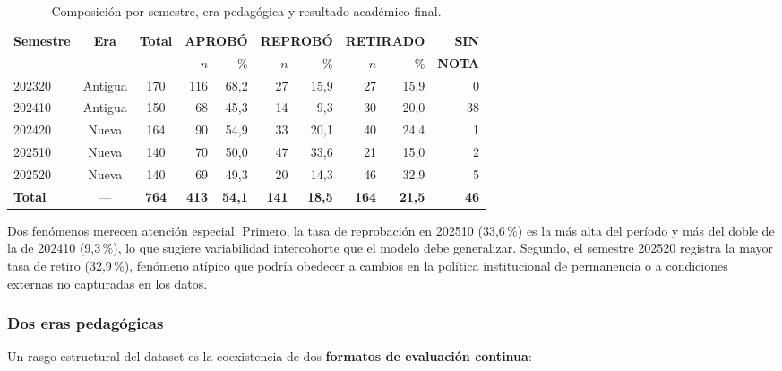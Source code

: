 \begin{table}[htbp]
  \centering
  \caption{Composición por semestre, era pedagógica y resultado
           académico final.}
  \label{tab:composicion_semestral}
  \small
  \begin{tabular}{lccrrrrrrr}
    \toprule
    \textbf{Semestre} & \textbf{Era} & \textbf{Total}
      & \multicolumn{2}{c}{\textbf{APROBÓ}}
      & \multicolumn{2}{c}{\textbf{REPROBÓ}}
      & \multicolumn{2}{c}{\textbf{RETIRADO}}
      & \textbf{SIN} \\
    \cmidrule(lr){4-5}\cmidrule(lr){6-7}\cmidrule(lr){8-9}
    & & & $n$ & \% & $n$ & \% & $n$ & \% & \textbf{NOTA} \\
    \midrule
    202320 & Antigua & 170 & 116 & 68,2 &  27 & 15,9 &  27 & 15,9 & 0  \\
    202410 & Antigua & 150 &  68 & 45,3 &  14 &  9,3 &  30 & 20,0 & 38 \\
    202420 & Nueva   & 164 &  90 & 54,9 &  33 & 20,1 &  40 & 24,4 & 1  \\
    202510 & Nueva   & 140 &  70 & 50,0 &  47 & 33,6 &  21 & 15,0 & 2  \\
    202520 & Nueva   & 140 &  69 & 49,3 &  20 & 14,3 &  46 & 32,9 & 5  \\
    \midrule
    \textbf{Total} & — & \textbf{764}
      & \textbf{413} & \textbf{54,1}
      & \textbf{141} & \textbf{18,5}
      & \textbf{164} & \textbf{21,5}
      & \textbf{46} \\
    \bottomrule
  \end{tabular}
\end{table}

Dos fenómenos merecen atención especial. Primero, la tasa de
reprobación en 202510 (33,6\,\%) es la más alta del período y
más del doble de la de 202410 (9,3\,\%), lo que sugiere
variabilidad intercohorte que el modelo debe generalizar. Segundo,
el semestre 202520 registra la mayor tasa de retiro (32,9\,\%),
fenómeno atípico que podría obedecer a cambios en la política
institucional de permanencia o a condiciones externas no
capturadas en los datos.

\subsubsection{Dos eras pedagógicas}
\label{sssec:eras}

Un rasgo estructural del dataset es la coexistencia de dos
\textbf{formatos de evaluación continua}:

